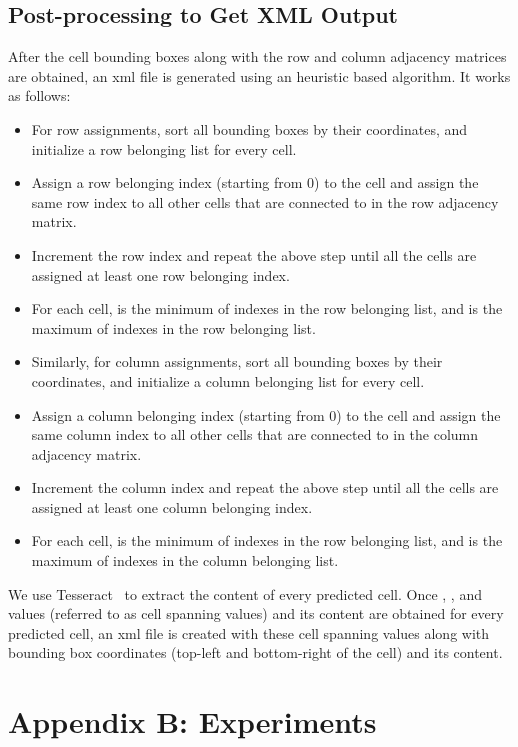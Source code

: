 \documentclass[runningheads]{llncs}
\begin{document}
\subsection*{Post-processing to Get XML Output}

After the cell bounding boxes along with the row and column adjacency matrices are obtained, an {\sc xml} file is generated using an heuristic based algorithm. It works as follows:
\begin{itemize}
\item For row assignments, sort all bounding boxes by their  coordinates, and initialize a row belonging list for every cell.
\item Assign a row belonging index (starting from 0) to the cell  and assign the same row index to all other cells that are connected to  in the row adjacency matrix.
\item Increment the row index and repeat the above step until all the cells are assigned at least one row belonging index.
\item For each cell,  is the minimum of indexes in the row belonging list, and  is the maximum of indexes in the row belonging list.
\item Similarly, for column assignments, sort all bounding boxes by their  coordinates, and initialize a column belonging list for every cell.
\item Assign a column belonging index (starting from 0) to the cell  and assign the same column index to all other cells that are connected to  in the column adjacency matrix.
\item Increment the column index and repeat the above step until all the cells are assigned at least one column belonging index.
\item For each cell,  is the minimum of indexes in the row belonging list, and  is the maximum of indexes in the column belonging list.
\end{itemize}

We use Tesseract~\cite{smith2007overview} to extract the content of every predicted cell. Once , ,  and  values (referred to as cell spanning values) and its content are obtained for every predicted cell, an {\sc xml} file is created with these cell spanning values along with bounding box coordinates (top-left and bottom-right of the cell) and its content.

\section*{Appendix B: Experiments}
\end{document}
